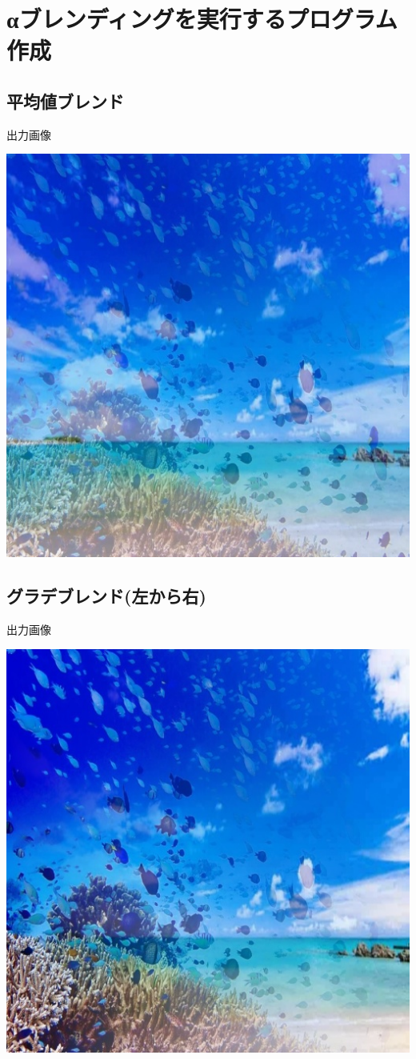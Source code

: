 \documentclass[a4paper,11pt,titlepage]{jsarticle}
\begin{document}
\section{αブレンディングを実行するプログラム作成}
\subsection{平均値ブレンド}


出力画像
\begin{center}
  \includegraphics[width=0.8\linewidth]{alpha_fixed.jpg} 
\end{center}

\subsection{グラデブレンド(左から右)}


出力画像
\begin{center}
  \includegraphics[width=0.8\linewidth]{alpha_gradient.jpg} 
\end{center}
\end{document}

